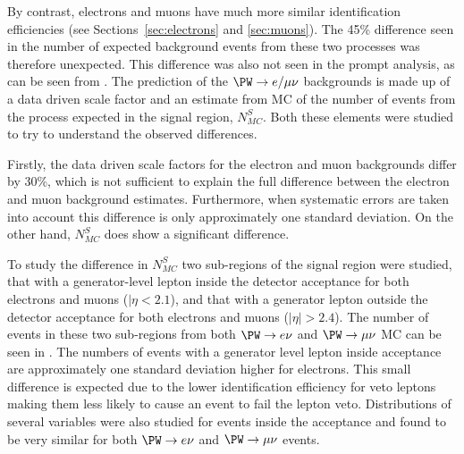 By contrast, electrons and muons have much more similar identification efficiencies (see Sections~\ref{sec:electrons} and \ref{sec:muons}). The 45\% difference seen in the number of expected background events from these two processes was therefore unexpected. This difference was also not seen in the prompt analysis, as can be seen from . The prediction of the $\PW\rightarrow e/\mu\nu$ backgrounds is made up of a data driven scale factor and an estimate from \ac{MC} of the number of events from the process expected in the signal region, $N_{MC}^{S}$. Both these elements were studied to try to understand the observed differences.

Firstly, the data driven scale factors for the electron and muon backgrounds differ by 30\%, which is not sufficient to explain the full difference between the electron and muon background estimates. Furthermore, when systematic errors are taken into account this difference is only approximately one standard deviation. On the other hand, $N_{MC}^{S}$ does show a significant difference.

To study the difference in $N_{MC}^{S}$ two sub-regions of the signal region were studied, that with a generator-level lepton inside the detector acceptance for both electrons and muons ($|\eta<2.1$), and that with a generator lepton outside the detector acceptance for both electrons and muons ($|\eta|>2.4$). The number of events in these two sub-regions from both $\PW\rightarrow e\nu$ and $\PW\rightarrow\mu\nu$ \ac{MC} can be seen in . The numbers of events with a generator level lepton inside acceptance are approximately one standard deviation higher for electrons. This small difference is expected due to the lower identification efficiency for veto leptons making them less likely to cause an event to fail the lepton veto. Distributions of several variables were also studied for events inside the acceptance and found to be very similar for both $\PW\rightarrow e\nu$ and $\PW\rightarrow\mu\nu$ events.


